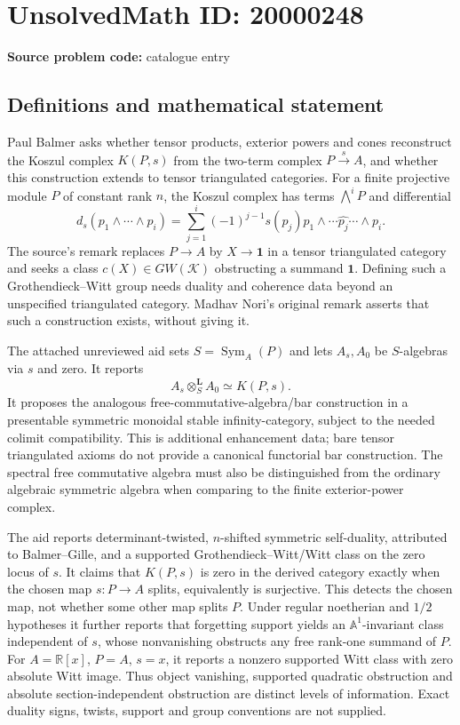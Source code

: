 \documentclass[11pt]{article}
\newcommand{\R}{\mathbb{R}}
\newcommand{\A}{\mathbb{A}}
\begin{document}
\section*{UnsolvedMath ID: 20000248}
\textbf{Source problem code:} catalogue entry
\subsection{Definitions and mathematical statement}
Paul Balmer asks whether tensor products, exterior powers and cones reconstruct the Koszul complex $K(P,s)$ from the two-term complex $P\xrightarrow{s}A$, and whether this construction extends to tensor triangulated categories. For a finite projective module $P$ of constant rank $n$, the Koszul complex has terms $\bigwedge^iP$ and differential
\[
d_s(p_1\wedge\cdots\wedge p_i)=\sum_{j=1}^i(-1)^{j-1}s(p_j)p_1\wedge\cdots\widehat{p_j}\cdots\wedge p_i.
\]
The source's remark replaces $P\to A$ by $X\to\mathbf1$ in a tensor triangulated category and seeks a class $c(X)\in GW(\mathcal K)$ obstructing a summand $\mathbf1$. Defining such a Grothendieck--Witt group needs duality and coherence data beyond an unspecified triangulated category. Madhav Nori's original remark asserts that such a construction exists, without giving it.

The attached unreviewed aid sets $S=\operatorname{Sym}_A(P)$ and lets $A_s,A_0$ be $S$-algebras via $s$ and zero. It reports
\[
A_s\otimes_S^{\mathbf L}A_0\simeq K(P,s).
\]
It proposes the analogous free-commutative-algebra/bar construction in a presentable symmetric monoidal stable infinity-category, subject to the needed colimit compatibility. This is additional enhancement data; bare tensor triangulated axioms do not provide a canonical functorial bar construction. The spectral free commutative algebra must also be distinguished from the ordinary algebraic symmetric algebra when comparing to the finite exterior-power complex.

The aid reports determinant-twisted, $n$-shifted symmetric self-duality, attributed to Balmer--Gille, and a supported Grothendieck--Witt/Witt class on the zero locus of $s$. It claims that $K(P,s)$ is zero in the derived category exactly when the chosen map $s:P\to A$ splits, equivalently is surjective. This detects the chosen map, not whether some other map splits $P$. Under regular noetherian and $1/2$ hypotheses it further reports that forgetting support yields an $\A^1$-invariant class independent of $s$, whose nonvanishing obstructs any free rank-one summand of $P$. For $A=\R[x]$, $P=A$, $s=x$, it reports a nonzero supported Witt class with zero absolute Witt image. Thus object vanishing, supported quadratic obstruction and absolute section-independent obstruction are distinct levels of information. Exact duality signs, twists, support and group conventions are not supplied.
\end{document}
